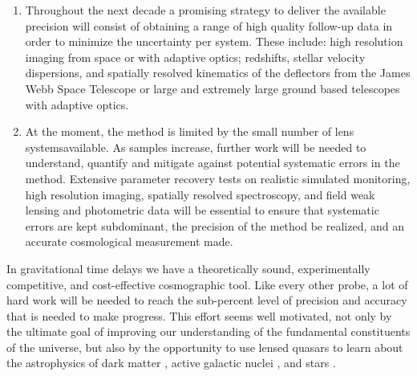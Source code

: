 \begin{enumerate}
%
\item Throughout the next decade a promising strategy to deliver the
available precision will consist of obtaining a range of high quality
follow-up data in order to minimize the uncertainty per system. These
include: high resolution imaging from space or with adaptive optics;
redshifts, stellar velocity dispersions, and spatially resolved
kinematics of the deflectors from the James Webb Space Telescope or
large and extremely large ground based telescopes with adaptive
optics.
%
%
\item  At the moment, the method is limited by the small number of lens
systemsavailable. As samples increase, further work will be needed to
understand, quantify and mitigate against potential systematic errors
in the method. Extensive parameter recovery tests on realistic
simulated monitoring, high resolution imaging, spatially resolved
spectroscopy, and field weak lensing and photometric data will be
essential to ensure that systematic errors are kept subdominant, the
precision of the method be realized, and an accurate cosmological
measurement made.
\end{enumerate}


In gravitational time delays we have a theoretically sound,
experimentally competitive, and cost-effective cosmographic tool.
Like every other probe, a lot of hard work will be needed to reach the
sub-percent level of precision and accuracy that is needed to make
progress. This effort seems well motivated, not only by the ultimate
goal of improving our understanding of the fundamental constituents of
the universe, but also by the opportunity to use lensed quasars to
learn about the astrophysics of dark matter
\citep{Metcalf:2005p1203,Xu++09,Veg++14,Nie++14}, active galactic
nuclei \citep{PMK08,Eig++08a,Eig++08b,Blackburne:2010p6600,Mac++15}, and stars
\citep{Sch++14}.

